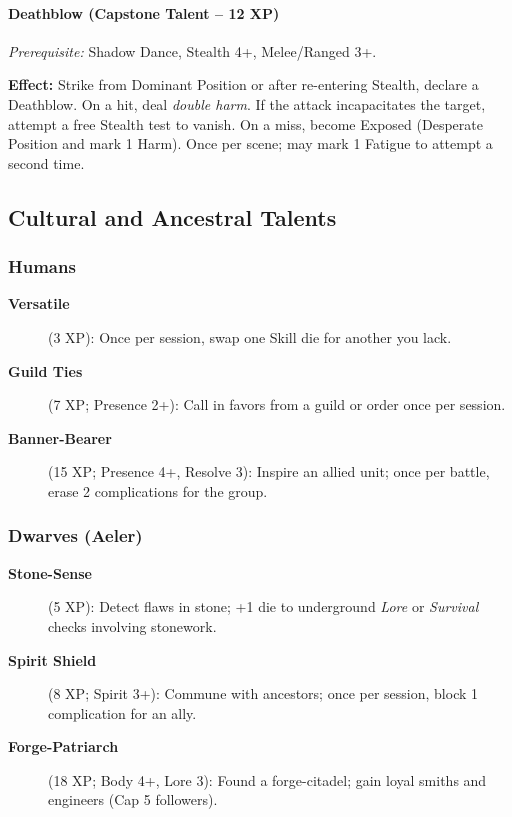 \paragraph{Deathblow (Capstone Talent -- 12 XP)}
\textit{Prerequisite:} Shadow Dance, Stealth 4+, Melee/Ranged 3+.

\noindent \textbf{Effect:} Strike from Dominant Position or after re-entering Stealth, declare a Deathblow. On a hit, deal \emph{double harm}. If the attack incapacitates the target, attempt a free Stealth test to vanish. On a miss, become Exposed (Desperate Position and mark 1 Harm). Once per scene; may mark 1 Fatigue to attempt a second time.

\subsection{Cultural and Ancestral Talents}\label{subsec:cultural_talents}

\subsubsection{Humans}\label{subsubsec:human_talents}

\begin{description}
    \item[\textbf{Versatile}] (3 XP): Once per session, swap one Skill die for another you lack.
    \item[\textbf{Guild Ties}] (7 XP; Presence 2+): Call in favors from a guild or order once per session.
    \item[\textbf{Banner-Bearer}] (15 XP; Presence 4+, Resolve 3): Inspire an allied unit; once per battle, erase 2 complications for the group.
\end{description}

\subsubsection{Dwarves (Aeler)}\label{subsubsec:dwarf_talents}

\begin{description}
    \item[\textbf{Stone-Sense}] (5 XP): Detect flaws in stone; +1 die to underground \emph{Lore} or \emph{Survival} checks involving stonework.
    \item[\textbf{Spirit Shield}] (8 XP; Spirit 3+): Commune with ancestors; once per session, block 1 complication for an ally.
    \item[\textbf{Forge-Patriarch}] (18 XP; Body 4+, Lore 3): Found a forge-citadel; gain loyal smiths and engineers (Cap 5 followers).
\end{description}

